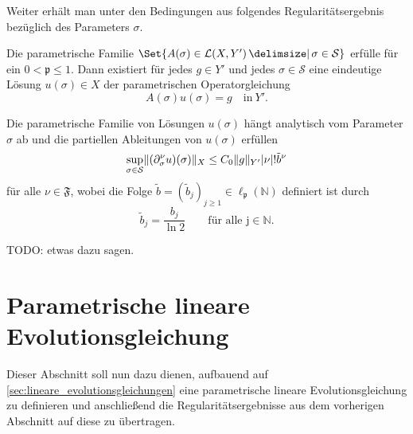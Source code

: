 Weiter erhält man unter den Bedingungen aus  folgendes Regularitätsergebnis bezüglich des Parameters $\sigma$.

\begin{Satz}
\label{thm:kunoth:theorem4}
    Die parametrische Familie $\Set{ A(\sigma) \in \mathcal L(X, Y') \given \sigma \in \mathcal S }$ erfülle  für ein $0 < \mathfrak p \leq 1$.
    Dann existiert für jedes $g \in Y'$ und jedes $\sigma \in \mathcal S$ eine eindeutige Lösung $u(\sigma) \in X$ der parametrischen Operatorgleichung
    \begin{equation}
        A(\sigma) u(\sigma) = g \quad \text{in}~Y'.
    \end{equation}

    Die parametrische Familie von Lösungen $u(\sigma)$ hängt analytisch vom Parameter $\sigma$ ab und die partiellen Ableitungen von $u(\sigma)$ erfüllen
    \begin{equation}
        \label{eq:kunoth:schranke_part_abl}
        \sup_{\sigma \in \mathcal S} \lVert(\partial^{\nu}_{\sigma} u)(\sigma)\rVert_{X} \leq C_{0} \lVert g\rVert_{Y'} \lvert\nu\rvert! \tilde{b}^{\nu}
    \end{equation}
    für alle $\nu \in \mathfrak F$, wobei die Folge $\tilde{b} = (\tilde{b}_{j})_{j \geq 1} \in \ell_{\mathfrak p}(\mathbb{N})$ definiert ist durch
    \begin{equation}
        \tilde{b}_{j} = \frac{b_{j}}{\ln 2} \qquad \text{für alle j} \in \mathbb{N}.
    \end{equation}

    \begin{Beweis}
        TODO: etwas dazu sagen.
    \end{Beweis}
\end{Satz}


\section{Parametrische lineare Evolutionsgleichung} %
\label{sec:parametrische_lineare_evolutionsgleichung}

Dieser Abschnitt soll nun dazu dienen, aufbauend auf \autoref{sec:lineare_evolutionsgleichungen} eine parametrische lineare Evolutionsgleichung zu definieren und anschließend die Regularitätsergebnisse aus dem vorherigen Abschnitt auf diese zu übertragen.


